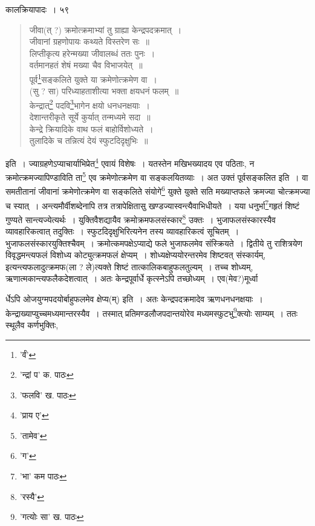 \documentclass[11pt, openany]{book}
\begin{document}
{{{{{\newpage

\vspace{3cm} \hspace{4cm} कालक्रियापादः~।\hspace{4cm} ५९ 

\vspace{0.3cm}
\begin{quote}
{\qt जीवा(त् ?) क्रमोत्क्रमाभ्यां तु ग्राह्या केन्द्रपदक्रमात्~।\\
जीवानां ग्रहणोपायः कथ्यते विस्तरेण सः~॥\\
लिप्तीकृत्य हरेन्मख्या जीवालब्धं ततः पुनः~।\\
वर्तमानहतं शेषं मख्या चैव विभाजयेत्~॥\\
पूर्व\renewcommand{\thefootnote}{१}\footnote{'र्वं'}सङ्कलिते युक्ते या क्रमेणोत्क्रमेण वा~।\\
(सु ? सा) परिध्याहताशीत्या भक्ता क्षयधनं फलम्~॥\\
केन्द्रात्\renewcommand{\thefootnote}{२}\footnote{'न्द्रां प' क. पाठः} पदवि\renewcommand{\thefootnote}{३}\footnote{'फलवि' ख. पाठः}भागेन क्षयो धनधनक्षयाः~।\\
देशान्तरीकृते सूर्ये कुर्यात् तन्मध्यमे सदा~॥\\
केन्द्रे क्रियादिके वाथ फलं बाहोर्विशोध्यते~।\\
तुलादिके च तन्नित्यं देयं स्फुटदिदृक्षुभिः~॥}
\end{quote}

\noindent इति~। ज्याग्रहणेऽप्याचार्याभिप्रेत\renewcommand{\thefootnote}{४}\footnote{'प्राय ए'} एवायं विशेषः~। यतस्तेन मखिभख्यादय एव पठिताः, न क्रमोत्क्रमज्यापिण्डाविति ता\renewcommand{\thefootnote}{५}\footnote{'तामेव'} एव क्रमेणोत्क्रमेण वा सङ्कलयितव्याः~। अत उक्तं पूर्वसङ्कलित इति~। वा समतीतानां जीवानां क्रमेणोत्क्रमेण वा सङ्कलिते संयोगे\renewcommand{\thefootnote}{६}\footnote{'ग'} युक्ते युक्ते सति मख्याप्तफले क्रमज्या चोत्क्रमज्या च स्यात्~। अन्त्यमौर्वीशब्देनापि तत्र तत्रापेक्षितासु खण्डज्यास्वन्त्यैवाभिधीयते~। यया धनुर्भा\renewcommand{\thefootnote}{७}\footnote{'भा' कम पाठः}गहृतं शिष्टं गुण्यते सान्त्यज्येत्यर्थः~। युक्तिवैशद्यायैव क्रमोक्रमफलसंस्कार\renewcommand{\thefootnote}{८}\footnote{'रस्यै'} उक्तः~। भुजाफलसंस्कारस्यैव व्यावहारिकत्वात् तदुक्तिः~। स्फुटदिदृक्षुभिरित्यनेन तस्य व्यावहारिकत्वं सूचितम्~। भुजाफलसंस्कारयुक्तिश्चैवम्~। क्रमोत्कमपक्षेऽप्याद्ये फले भुजाफलमेव
संस्क्रियते~। द्वितीये तु राशित्रयेण विवृद्धमन्त्यफलं विशोध्य कोट्युत्क्रमफलं क्षेप्यम्~। शोध्यक्षेप्ययोरन्तरमेव शिष्टवत् संस्कार्यम्, इत्यन्त्यफलादुत्क्रमफ(ला ? ले)त्यक्ते शिष्टं तात्कालिकबाहुफलतुल्यम्~। तच्च शोध्यम्, ऋणात्मकान्त्यफलैकदेशत्वात्~। अतः केन्द्रपूर्वार्धे कृत्स्नेऽपि तच्छोध्यम्~। एव(मेव?)मूर्ध्वा}र्धेऽपि ओजयुग्मपदयोर्बाहुफलमेव क्षेप्य(म्) इति~। अतः केन्द्रपदक्रमादेव ऋणधनधनक्षयाः~। केन्द्राख्याप्युच्चमध्यमान्तरस्यैव~। तस्मात् प्रतिमण्डलौजपदान्तयोरेव मध्यमस्फुटभु\renewcommand{\thefootnote}{९}\footnote{'गत्योः सा' ख. पाठः}क्त्योः साम्यम्~। ततः स्थूलैव
कर्णभुक्तिः, 


}}}}
\end{document}
